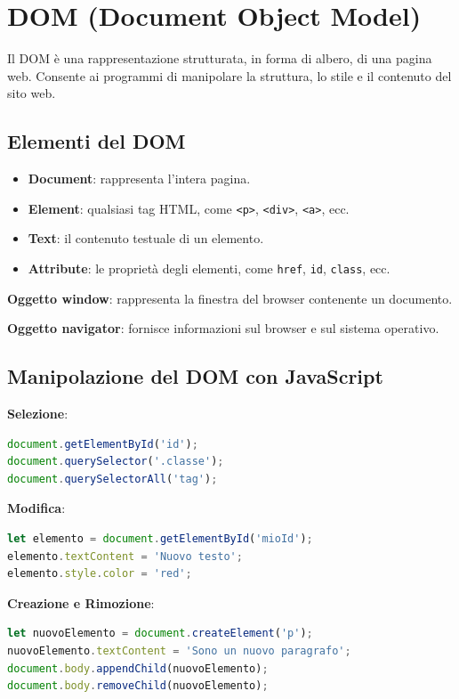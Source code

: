 \section{DOM (Document Object Model)}

Il DOM è una rappresentazione strutturata, in forma di albero, di una pagina web. Consente ai programmi di manipolare la struttura, lo stile e il contenuto del sito web.

\subsection{Elementi del DOM}

\begin{itemize}
    \item \textbf{Document}: rappresenta l'intera pagina.
    \item \textbf{Element}: qualsiasi tag HTML, come \texttt{<p>}, \texttt{<div>}, \texttt{<a>}, ecc.
    \item \textbf{Text}: il contenuto testuale di un elemento.
    \item \textbf{Attribute}: le proprietà degli elementi, come \texttt{href}, \texttt{id}, \texttt{class}, ecc.
\end{itemize}

\textbf{Oggetto window}: rappresenta la finestra del browser contenente un documento.

\textbf{Oggetto navigator}: fornisce informazioni sul browser e sul sistema operativo.

\subsection{Manipolazione del DOM con JavaScript}

\textbf{Selezione}:
\begin{lstlisting}[language=JavaScript]
document.getElementById('id');
document.querySelector('.classe');
document.querySelectorAll('tag');
\end{lstlisting}

\textbf{Modifica}:
\begin{lstlisting}[language=JavaScript]
let elemento = document.getElementById('mioId');
elemento.textContent = 'Nuovo testo';
elemento.style.color = 'red';
\end{lstlisting}

\textbf{Creazione e Rimozione}:
\begin{lstlisting}[language=JavaScript]
let nuovoElemento = document.createElement('p');
nuovoElemento.textContent = 'Sono un nuovo paragrafo';
document.body.appendChild(nuovoElemento);
document.body.removeChild(nuovoElemento);
\end{lstlisting}

